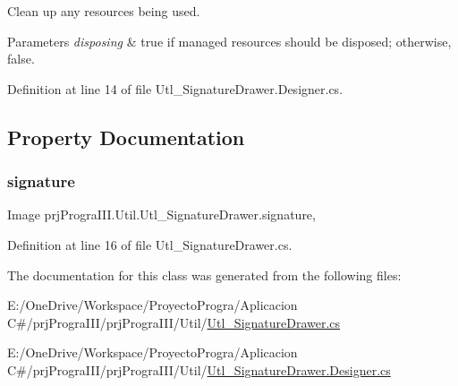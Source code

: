 Clean up any resources being used. 


\begin{DoxyParams}{Parameters}
{\em disposing} & true if managed resources should be disposed; otherwise, false.\\
\hline
\end{DoxyParams}


Definition at line 14 of file Utl\+\_\+\+Signature\+Drawer.\+Designer.\+cs.



\subsection{Property Documentation}
\hypertarget{classprj_progra_i_i_i_1_1_util_1_1_utl___signature_drawer_aceabe33b7a11ca45bb78ad01479aa053}{}\label{classprj_progra_i_i_i_1_1_util_1_1_utl___signature_drawer_aceabe33b7a11ca45bb78ad01479aa053} 
\subsubsection{\texorpdfstring{signature}{signature}}
{\footnotesize\ttfamily Image prj\+Progra\+I\+I\+I.\+Util.\+Utl\+\_\+\+Signature\+Drawer.\+signature\hspace{0.3cm}{\ttfamily [get]}, {\ttfamily [set]}}



Definition at line 16 of file Utl\+\_\+\+Signature\+Drawer.\+cs.



The documentation for this class was generated from the following files\+:\begin{DoxyCompactItemize}
\item 
E\+:/\+One\+Drive/\+Workspace/\+Proyecto\+Progra/\+Aplicacion C\#/prj\+Progra\+I\+I\+I/prj\+Progra\+I\+I\+I/\+Util/\hyperlink{_utl___signature_drawer_8cs}{Utl\+\_\+\+Signature\+Drawer.\+cs}\item 
E\+:/\+One\+Drive/\+Workspace/\+Proyecto\+Progra/\+Aplicacion C\#/prj\+Progra\+I\+I\+I/prj\+Progra\+I\+I\+I/\+Util/\hyperlink{_utl___signature_drawer_8_designer_8cs}{Utl\+\_\+\+Signature\+Drawer.\+Designer.\+cs}\end{DoxyCompactItemize}
